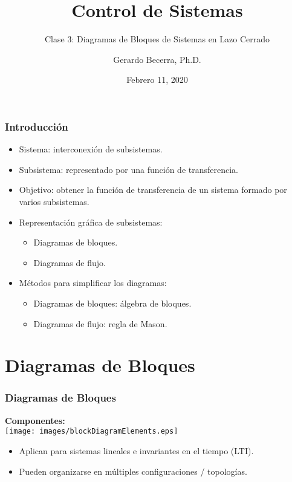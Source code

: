 \documentclass[aspectratio=169,handout]{beamer}
\title{Control de Sistemas}
\subtitle{\small Clase 3: Diagramas de Bloques de Sistemas en Lazo Cerrado}
\author{Gerardo Becerra, Ph.D.}
\institute{Pontificia Universidad Javeriana\\ Departamento de Electrónica}
\date{Febrero 11, 2020}
\theoremstyle{definition}
\theoremstyle{plain}
\theoremstyle{remark}
\begin{document}
\frame{\titlepage}	


\begin{frame}[<+->]\frametitle{Introducción}
\begin{itemize}
	\item Sistema: interconexión de subsistemas.
	\item Subsistema: representado por una función de transferencia.
	\item Objetivo: obtener la función de transferencia de un sistema formado por varios subsistemas.
	\item Representación gráfica de subsistemas:
	\begin{itemize}
		\item Diagramas de bloques.
		\item Diagramas de flujo.
	\end{itemize}
	\item Métodos para simplificar los diagramas:
	\begin{itemize}
		\item Diagramas de bloques: álgebra de bloques.
		\item Diagramas de flujo: regla de Mason.
	\end{itemize}
\end{itemize}
\end{frame}

\section{Diagramas de Bloques}
\begin{frame}[<+->]\frametitle{Diagramas de Bloques}
\textbf{Componentes:}\\
\vspace*{5mm}
\centering
\texttt{[image: images/blockDiagramElements.eps]}
\begin{itemize}
	\item Aplican para sistemas lineales e invariantes en el tiempo (LTI).
	\item Pueden organizarse en múltiples configuraciones / topologías.
\end{itemize}
\end{frame}
\end{document}
